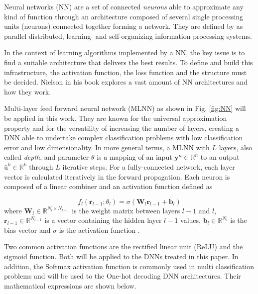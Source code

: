 \documentclass[conference]{IEEEtran}
\begin{document}
Neural networks (NN) are a set of connected \textit{neurons} able to approximate any kind of function through an architecture composed of several single processing units (neurons) connected together forming a network. They are defined by \cite{Ibnkahla} as parallel distributed, learning- and self-organizing information processing systems. 

In the context of learning algorithms implemented by a NN, the key issue is to find a suitable architecture that delivers the best results. To define and build this infrastructure, the activation function, the loss function and the structure must be decided. Nielson \cite{nielsenneural} in his book explores a vast amount of NN architectures and how they work. 

Multi-layer feed forward neural network (MLNN) as shown in Fig. \ref{fig:NN} will be applied in this work. They are known for the universal approximation property \cite{Ibnkahla} and for the versatility of increasing the number of layers, creating a DNN able to undertake complex classification problems with low classification error and low dimensionality. In more general terms, a MLNN with $L$ layers, also called \textit{depth}, and parameter $\theta$ is a mapping of an input $\textbf{y}^n \in \mathbb{R}^{n}$ to an output $\textbf{û}^k \in \mathbb{R}^{k}$ through $L$ iterative steps. For a fully-connected network, each layer vector is calculated iteratively in the forward propagation. Each neuron is composed of a linear combiner and an activation function defined as 

\begin{equation}\label{eq:eqFP}
	f_{l}\left( \textbf{r}_{l-1};\theta _{l}\right) = \sigma \left( \textbf{W}_{l}\textbf{r}_{l-1}+\textbf{b}_{l}\right)
\end{equation}
where $\textbf{W}_{l}\in \mathbb{R} ^{N_{l}\times N_{l-1}}$ is the weight matrix between layers $l-1$ and $l$, $\textbf{r}_{l-1} \in \mathbb{R} ^{N_{l-1}}$ is a vector containing the hidden layer $l-1$ values, $\textbf{b}_{l}\in \mathbb{R} ^{N_l}$ is the bias vector and $\sigma$ is the activation function \cite{DBLP:journals/corr/OSheaH17}.

%
Two common activation functions are the rectified linear unit (ReLU) and the sigmoid function. Both will be applied to the DNNs treated in this paper. In addition, the Softmax activation function is commonly used in multi classification problems and will be used to the One-hot decoding DNN architectures. Their mathematical expressions are shown below.
\end{document}

